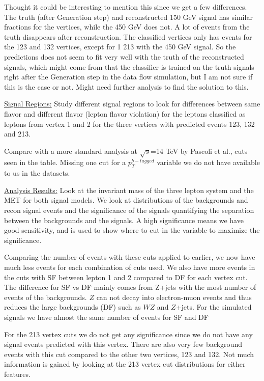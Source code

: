\documentclass[a4paper, american, 12pt]{report}
\begin{document}
	Thought it could be interesting to mention this since we get a few differences. The truth (after Generation step) and reconstructed 150 GeV signal has similar fractions for the vertices, while the 450 GeV does not. A lot of events from the truth disappears after reconstruction. The classified vertices only has events for the 123 and 132 vertices, except for 1 213 with the 450 GeV signal. So the predictions does not seem to fit very well with the truth of the reconstructed signals, which might come from that the classifier is trained on the truth signals right after the Generation step in the data flow simulation, but I am not sure if this is the case or not. Might need further analysis to find the solution to this.
	
	
	\underline{Signal Regions:}
	Study different signal regions to look for differences between same flavor and different flavor (lepton flavor violation) for the leptons classified as leptons from vertex 1 and 2 for the three vertices with predicted events 123, 132 and 213. 
	
	Compare with a more standard analysis at $\sqrt{s}$=14 TeV by Pascoli et al., cuts seen in the table. Missing one cut for a $p_T^{b-tagged}$ variable we do not have available to us in the datasets.
	
	
	\underline{Analysis Results:}
	Look at the invariant mass of the three lepton system and the MET for both signal models. We look at distributions of the backgrounds and recon signal events and the significance of the signals quantifying the separation between the backgrounds and the signals. A high significance means we have good sensitivity, and is used to show where to cut in the variable to maximize the significance.
	
	Comparing the number of events with these cuts applied to earlier, we now have much less events for each combination of cuts used. We also have more events in the cuts with SF between lepton 1 and 2 compared to DF for each vertex cut. The difference for SF vs DF mainly comes from Z+jets with the most number of events of the backgrounds. $Z$ can not decay into electron-muon events and thus reduces the large backgrounds (DF) such as $W$$Z$ and $Z$+jets. For the simulated signals we have almost the same number of events for SF and DF
	
	For the 213 vertex cuts we do not get any significance since we do not have any signal events predicted with this vertex. There are also very few background events with this cut compared to the other two vertices, 123 and 132. Not much information is gained by looking at the 213 vertex cut distributions for either features.
	
\end{document}
